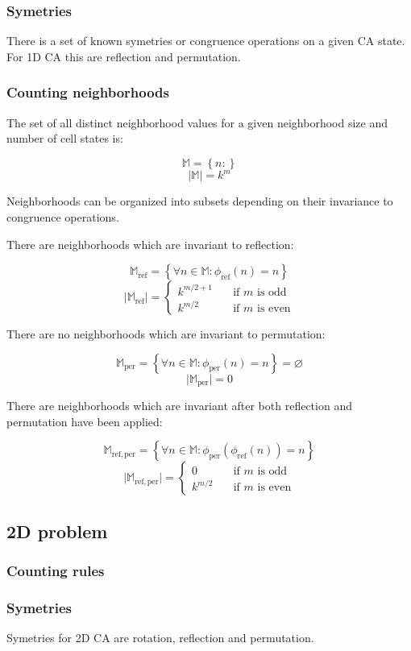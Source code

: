 \documentclass{ijuc}
\begin{document}
\subsubsection{Symetries}

There is a set of known symetries or congruence operations on a given CA state.
For 1D CA this are reflection and permutation.

\subsubsection{Counting neighborhoods}

The set of all distinct neighborhood values for a given neighborhood size and
number of cell states is:

\[ \mathbb{M} = \left\{ n : \right\} \]
\[ \vert \mathbb{M} \vert = k^m \]

Neighborhoods can be organized into subsets depending on their invariance to congruence operations.

There are neighborhoods which are invariant to reflection:

\[ \mathbb{M}_\mathrm{ref} = \left\{ \forall n \in \mathbb{M} : \phi_\mathrm{ref}(n) = n \right\} \]
\[ \vert \mathbb{M}_\mathrm{ref} \vert = \left\{ 
  \begin{array}{ll}
    {k^{m/2+1}} & \quad \textrm{if $m$ is odd }\\
    {k^{m/2  }} & \quad \textrm{if $m$ is even}
  \end{array} \right.
\]

There are no neighborhoods which are invariant to permutation:

\[ \mathbb{M}_\mathrm{per} = \left\{ \forall n \in \mathbb{M} : \phi_\mathrm{per}(n) = n \right\} = \varnothing \]
\[ \vert \mathbb{M}_\mathrm{per} \vert = 0 \]

There are neighborhoods which are invariant after both reflection and permutation have been applied:

\[ \mathbb{M}_\mathrm{ref,per} = \left\{ \forall n \in \mathbb{M} : \phi_\mathrm{per}(\phi_\mathrm{ref}(n)) = n \right\} \]
\[ \vert \mathbb{M}_\mathrm{ref,per} \vert = \left\{ 
  \begin{array}{ll}
    {0        } & \quad \textrm{if $m$ is odd }\\
    {k^{m/2  }} & \quad \textrm{if $m$ is even}
  \end{array} \right.
\]

\subsection{2D problem}

\subsubsection{Counting rules}

\subsubsection{Symetries}

Symetries for 2D CA are rotation, reflection and permutation.



\appendix 
\end{document}

